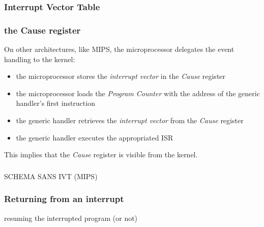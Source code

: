 %
%
%

\begin{frame}
  \frametitle{Interrupt Vector Table}

  \begin{center}
  \end{center}

\end{frame}

%
%
%

\begin{frame}
  \frametitle{the Cause register}

  On other architectures, like MIPS, the microprocessor delegates the event
  handling to the kernel:

  \-

  \begin{itemize}
    \item the microprocessor stores the {\em interrupt vector} in the
    {\em Cause} register
    \item the microprocessor loads the {\em Program Counter} with the
      address of the generic handler's first instruction
    \item the generic handler retrieves the {\em interrupt vector} from
      the {\em Cause} register
    \item the generic handler executes the appropriated ISR
  \end{itemize}

  \-

  This implies that the {\em Cause} register is visible from the kernel.
\end{frame}


%
%
%

\begin{frame}
  \frametitle{}

  SCHEMA SANS IVT (MIPS)

\end{frame}

%
%
%

\begin{frame}
  \frametitle{Returning from an interrupt}

  resuming the interrupted program (or not)


\end{frame}

%
%
%

